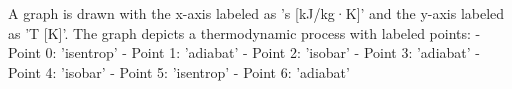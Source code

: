 A graph is drawn with the x-axis labeled as 's [kJ/kg·K]' and the y-axis labeled as 'T [K]'. The graph depicts a thermodynamic process with labeled points:  
- Point 0: 'isentrop'  
- Point 1: 'adiabat'  
- Point 2: 'isobar'  
- Point 3: 'adiabat'  
- Point 4: 'isobar'  
- Point 5: 'isentrop'  
- Point 6: 'adiabat'